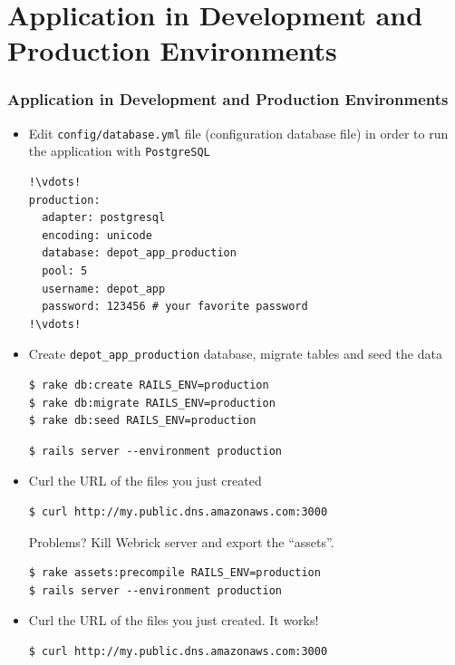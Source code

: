 \documentclass{beamer}
\begin{document}
\section{Application in Development and Production Environments}
\begin{frame}
\frametitle{Application in Development and Production Environments}
\begin{itemize}
\item Edit \texttt{config/database.yml} file (configuration database file) in order to run the application with \texttt{PostgreSQL}

\lstset{language=Ruby, style=eclipse, numbers=left}
\begin{lstlisting}[escapechar=!]
!\vdots!
production:
  adapter: postgresql
  encoding: unicode
  database: depot_app_production
  pool: 5
  username: depot_app
  password: 123456 # your favorite password
!\vdots!
\end{lstlisting}

\item Create \texttt{depot\_app\_production} database, migrate tables and  seed the data

\lstset{language=shell, style=eclipse}
\begin{lstlisting}[numbers=none, escapechar=!]
$ rake db:create RAILS_ENV=production
$ rake db:migrate RAILS_ENV=production
$ rake db:seed RAILS_ENV=production
\end{lstlisting}

\lstset{language=shell}
\begin{lstlisting}[escapechar=!]
$ rails server --environment production
\end{lstlisting}

\item Curl the URL of the files you just created

\lstset{language=shell}
\begin{lstlisting}[escapechar=!]
$ curl http://my.public.dns.amazonaws.com:3000
\end{lstlisting}

Problems? Kill Webrick server and export the ``assets''. 

\lstset{language=shell}
\begin{lstlisting}[escapechar=!]
$ rake assets:precompile RAILS_ENV=production
$ rails server --environment production
\end{lstlisting}

\item Curl the URL of the files you just created. It works!
\lstset{language=shell}
\begin{lstlisting}[escapechar=!]
$ curl http://my.public.dns.amazonaws.com:3000
\end{lstlisting}
\end{itemize}

\end{frame}
\end{document}
